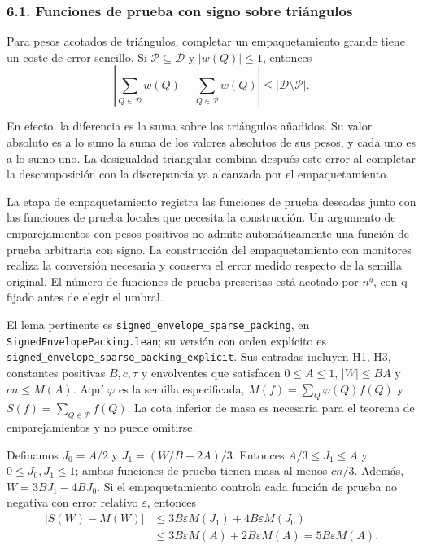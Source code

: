 \documentclass[spanish,11pt,a4paper]{article}
\begin{document}
\subsubsection{6.1. Funciones de prueba con signo sobre triángulos}\label{funciones-de-prueba-con-signo-sobre-triuxe1ngulos}

Para pesos acotados de triángulos, completar un empaquetamiento grande tiene un coste de error sencillo. Si \(\mathcal P\subseteq\mathcal D\) y \(|w(Q)|\leq1\), entonces
\[\left|\sum_{Q\in\mathcal D}w(Q)-\sum_{Q\in\mathcal P}w(Q)\right|
\leq|\mathcal D\setminus\mathcal P|.                               \tag{6.1}\]

En efecto, la diferencia es la suma sobre los triángulos añadidos. Su valor absoluto es a lo sumo la suma de los valores absolutos de sus pesos, y cada uno es a lo sumo uno. La desigualdad triangular combina después este error al completar la descomposición con la discrepancia ya alcanzada por el empaquetamiento.

La etapa de empaquetamiento registra las funciones de prueba deseadas junto con las funciones de prueba locales que necesita la construcción. Un argumento de emparejamientos con pesos positivos no admite automáticamente una función de prueba arbitraria con signo. La construcción del empaquetamiento con monitores realiza la conversión necesaria y conserva el error medido respecto de la semilla original. El número de funciones de prueba prescritas está acotado por \(n^q\), con q fijado antes de elegir el umbral.

El lema pertinente es \texttt{signed\_\allowbreak{}envelope\_\allowbreak{}sparse\_\allowbreak{}packing}, en \texttt{Signed\allowbreak{}Envelope\allowbreak{}Packing.\allowbreak{}lean}; su versión con orden explícito es \texttt{signed\_\allowbreak{}envelope\_\allowbreak{}sparse\_\allowbreak{}packing\_\allowbreak{}explicit}. Sus entradas incluyen H1, H3, constantes positivas \(B,c,\tau\) y envolventes que satisfacen \(0\leq A\leq1\), \(|W|\leq BA\) y \(cn\leq M(A)\). Aquí \(\varphi\) es la semilla especificada, \(M(f)=\sum_Q\varphi(Q)f(Q)\) y \(S(f)=\sum_{Q\in\mathcal P}f(Q)\). La cota inferior de masa es necesaria para el teorema de emparejamientos y no puede omitirse.

Definamos \(J_0=A/2\) y \(J_1=(W/B+2A)/3\). Entonces \(A/3\leq J_1\leq A\) y \(0\leq J_0,J_1\leq1\); ambas funciones de prueba tienen masa al menos \(cn/3\). Además, \(W=3BJ_1-4BJ_0\). Si el empaquetamiento controla cada función de prueba no negativa con error relativo \(\varepsilon\), entonces
\[\begin{aligned}|S(W)-M(W)|&\leq3B\varepsilon M(J_1)+4B\varepsilon M(J_0)\\&\leq3B\varepsilon M(A)+2B\varepsilon M(A)=5B\varepsilon M(A).\end{aligned}\]
\end{document}
